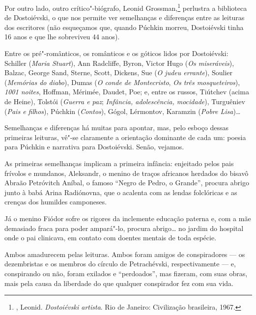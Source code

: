 Por outro lado, outro crítico"-biógrafo, Leonid Grossman,\footnote{, Leonid. \emph{Dostoiévski artista}. Rio de Janeiro: Civilização brasileira, 1967.} perlustra a biblioteca de Dostoiévski, o que nos permite ver semelhanças e diferenças entre as leituras dos escritores (não esqueçamos que, quando Púchkin morreu, Dostoiévski tinha 16 anos e que lhe sobreviveu 44 anos).

Entre os pré"-românticos, os românticos e os góticos lidos por
Dostoiévski: Schiller (\emph{Maria Stuart}), Ann Radcliffe, Byron,
Victor Hugo (\emph{Os miseráveis}), Balzac, George Sand, Sterne, Scott, Dickens, Sue (\emph{O judeu errante}), Soulier (\emph{Memórias
do diabo}), Dumas (\emph{O conde de Montecristo}, \emph{Os três
mosqueteiros}), \emph{1001 noites}, Hoffman, Mérimée, Daudet, Poe; e,
entre os russos, Tiútchev (acima de Heine), Tolstói (\emph{Guerra e paz}; \emph{Infância, adolescência, mocidade}), Turguêniev (\emph{Pais e
filhos}), Púchkin (\emph{Contos}), Gógol, Lérmontov, Karamzin (\emph{Pobre Lisa})\ldots{}

Semelhanças e diferenças há muitas para apontar, mas, pelo esboço dessas primeiras leituras, vê"-se claramente a orientação dominante de cada um: poesia para Púchkin e narrativa para Dostoiévski. Senão, vejamos.

As primeiras semelhanças implicam a primeira infância: enjeitado pelos pais frívolos e mundanos, Aleksandr, o menino de traços africanos herdados do bisavô Abraão Petróvitch Aníbal, o famoso ``Negro de Pedro, o Grande'', procura abrigo junto à babá Arina Radiónovna, que o acalenta com as lendas folclóricas e as crenças dos humildes camponeses.

Já o menino Fiódor sofre os rigores da inclemente educação paterna
e, com a mãe demasiado fraca para poder ampará"-lo, procura
abrigo\ldots{} no jardim do hospital onde o pai clinicava, em contato com doentes mentais de toda espécie.

Ambos amadurecem pelas leituras. Ambos foram amigos de conspiradores
--- os dezembristas e os membros do círculo de Petrachévski,
respectivamente --- e, conspirando ou não, foram exilados e
``perdoados'', mas fizeram, com suas obras, mais pela
causa da liberdade do que qualquer conspirador fez com sua
vida.

